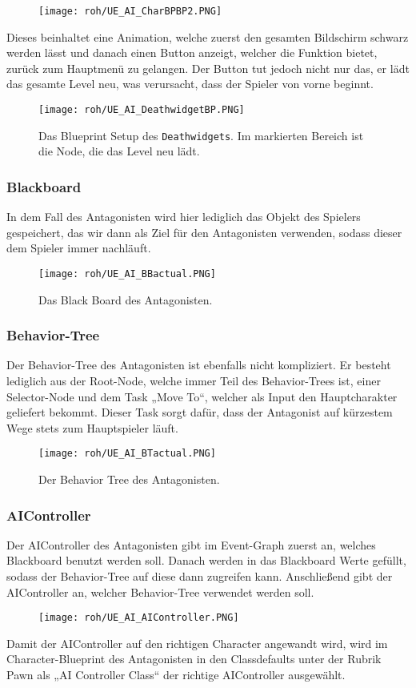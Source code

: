 \begin{figure}[H]
    \centering
    \texttt{[image: roh/UE\_AI\_CharBPBP2.PNG]}
    \label{UE:AI_CharBPBP2}
\end{figure}
Dieses beinhaltet eine Animation, welche zuerst den gesamten Bildschirm schwarz werden lässt und danach einen Button anzeigt, welcher die Funktion bietet, zurück zum Hauptmenü zu gelangen. Der Button tut jedoch nicht nur das, er lädt das gesamte Level neu, was verursacht, dass der Spieler von vorne beginnt.
\begin{figure}[H]
    \centering
    \texttt{[image: roh/UE\_AI\_DeathwidgetBP.PNG]}
    \caption{Das Blueprint Setup des {\tt Deathwidgets}. Im markierten Bereich ist die Node, die das Level neu lädt.}
    \label{UE:AI_DeathwidgetBP}
\end{figure}
\subsubsection{Blackboard}
In dem Fall des Antagonisten wird hier lediglich das Objekt des Spielers gespeichert, das wir dann als Ziel für den Antagonisten verwenden, sodass dieser dem Spieler immer nachläuft.
\begin{figure}[H]
    \centering
    \texttt{[image: roh/UE\_AI\_BBactual.PNG]}
    \caption{Das Black Board des Antagonisten.}
    \label{UE:AI_BBactual}
\end{figure}
\subsubsection{Behavior-Tree}
Der Behavior-Tree des Antagonisten ist ebenfalls nicht kompliziert. Er besteht lediglich aus der Root-Node, welche immer Teil des Behavior-Trees ist, einer Selector-Node und dem Task „Move To“, welcher als Input den Hauptcharakter geliefert bekommt. Dieser Task sorgt dafür, dass der Antagonist auf kürzestem Wege stets zum Hauptspieler läuft.
\begin{figure}[H]
    \centering
    \texttt{[image: roh/UE\_AI\_BTactual.PNG]}
    \caption{Der Behavior Tree des Antagonisten.}
    \label{UE:AI_BTactual}
\end{figure}
\subsubsection{AIController}
Der AIController des Antagonisten gibt im Event-Graph zuerst an, welches Blackboard benutzt werden soll. Danach werden in das Blackboard Werte gefüllt, sodass der Behavior-Tree auf diese dann zugreifen kann. Anschließend gibt der AIController an, welcher Behavior-Tree verwendet werden soll.
\begin{figure}[H]
    \centering
    \texttt{[image: roh/UE\_AI\_AIController.PNG]}
    \label{UE:AI_AIController}
\end{figure}
Damit der AIController auf den richtigen Character angewandt wird, wird im Character-Blueprint des Antagonisten in den Classdefaults unter der Rubrik Pawn als „AI Controller Class“ der richtige AIController ausgewählt.
